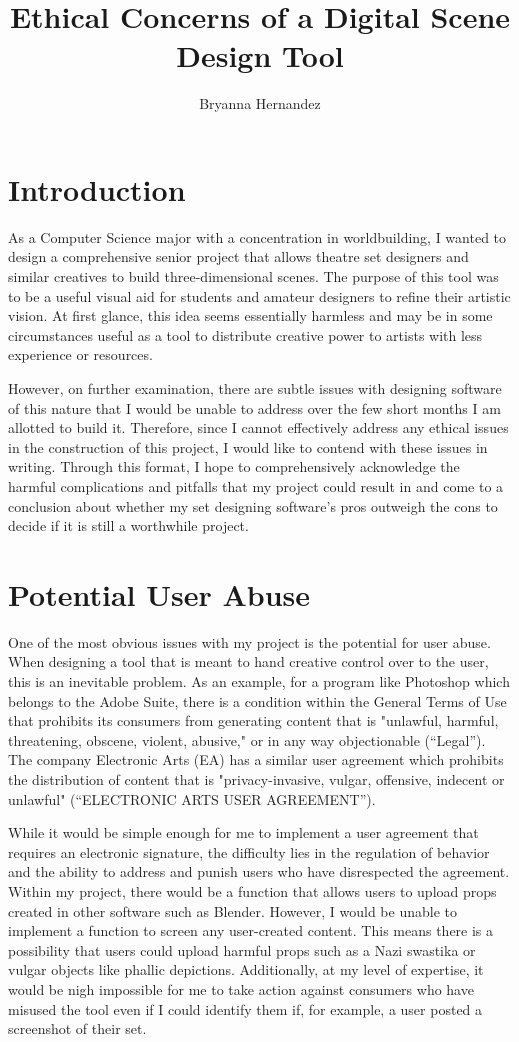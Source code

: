\documentclass[10pt,twocolumn]{article}
\title{Ethical Concerns of a Digital Scene Design Tool}
\author{Bryanna Hernandez}
\affiliation{Occidental College}
\begin{document}
\maketitle

\section{Introduction}
As a Computer Science major with a concentration in worldbuilding, I wanted to design a comprehensive senior project that allows theatre set designers and similar creatives to build three-dimensional scenes. The purpose of this tool was to be a useful visual aid for students and amateur designers to refine their artistic vision. At first glance, this idea seems essentially harmless and may be in some circumstances useful as a tool to distribute creative power to artists with less experience or resources.  

However, on further examination, there are subtle issues with designing software of this nature that I would be unable to address over the few short months I am allotted to build it. Therefore, since I cannot effectively address any ethical issues in the construction of this project, I would like to contend with these issues in writing. Through this format, I hope to comprehensively acknowledge the harmful complications and pitfalls that my project could result in and come to a conclusion about whether my set designing software's pros outweigh the cons to decide if it is still a worthwhile project. 
\section{Potential User Abuse}
One of the most obvious issues with my project is the potential for user abuse. When designing a tool that is meant to hand creative control over to the user, this is an inevitable problem. As an example, for a program like Photoshop which belongs to the Adobe Suite, there is a condition within the General Terms of Use that prohibits its consumers from generating content that is "unlawful, harmful, threatening, obscene, violent, abusive," or in any way objectionable (“Legal”). The company Electronic Arts (EA) has a similar user agreement which prohibits the distribution of content that is "privacy-invasive, vulgar, offensive, indecent or unlawful" (“ELECTRONIC ARTS USER AGREEMENT”).

While it would be simple enough for me to implement a user agreement that requires an electronic signature, the difficulty lies in the regulation of behavior and the ability to address and punish users who have disrespected the agreement. Within my project, there would be a function that allows users to upload props created in other software such as Blender. However, I would be unable to implement a function to screen any user-created content. This means there is a possibility that users could upload harmful props such as a Nazi swastika or vulgar objects like phallic depictions. Additionally, at my level of expertise, it would be nigh impossible for me to take action against consumers who have misused the tool even if I could identify them if, for example, a user posted a screenshot of their set. 
\end{document}

